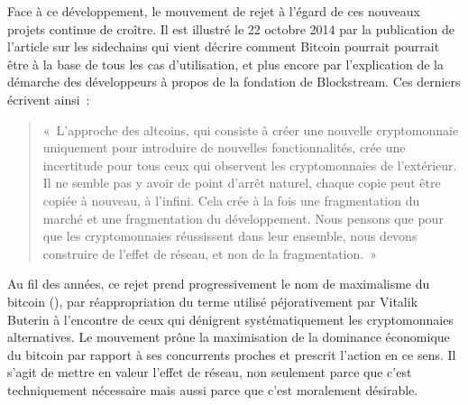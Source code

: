 Face à ce développement, le mouvement de rejet à l'égard de ces nouveaux projets continue de croître. Il est illustré le 22 octobre 2014 par la publication de l'article sur les sidechains qui vient décrire comment Bitcoin pourrait pourrait être à la base de tous les cas d'utilisation, et plus encore par l'explication de la démarche des développeurs à propos de la fondation de Blockstream. Ces derniers écrivent ainsi~:

\begin{quote}
«~L'approche des altcoins, qui consiste à créer une nouvelle cryptomonnaie uniquement pour introduire de nouvelles fonctionnalités, crée une incertitude pour tous ceux qui observent les cryptomonnaies de l'extérieur. Il ne semble pas y avoir de point d'arrêt naturel, chaque copie peut être copiée à nouveau, à l'infini. Cela crée à la fois une fragmentation du marché et une fragmentation du développement. Nous pensons que pour que les cryptomonnaies réussissent dans leur ensemble, nous devons construire de l'effet de réseau, et non de la fragmentation.~»
\end{quote}

Au fil des années, ce rejet prend progressivement le nom de maximalisme du bitcoin (), par réappropriation du terme utilisé péjorativement par Vitalik Buterin à l'encontre de ceux qui dénigrent systématiquement les cryptomonnaies alternatives. Le mouvement prône la maximisation de la dominance économique du bitcoin par rapport à ses concurrents proches et prescrit l'action en ce sens. Il s'agit de mettre en valeur l'effet de réseau, non seulement parce que c'est techniquement nécessaire mais aussi parce que c'est moralement désirable.

